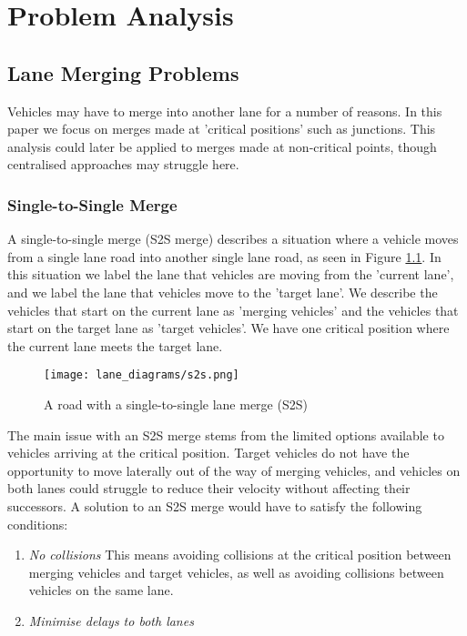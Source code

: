 \chapter{Problem Analysis}
\label{cha:Problem Analysis}

\section{Lane Merging Problems}
\label{sec:Lane Merging Problems}
Vehicles may have to merge into another lane for a number of reasons. In this paper we focus on merges made at 'critical positions' such as junctions. This analysis could later be applied to merges made at non-critical points, though centralised approaches may struggle here.

\subsection{Single-to-Single Merge}
\label{subsec:Single-to-Single Merge}
A single-to-single merge (S2S merge) describes a situation where a vehicle moves from a single lane road into another single lane road, as seen in Figure \ref{fig:S2SMerge}. In this situation we label the lane that vehicles are moving from the 'current lane', and we label the lane that vehicles move to the 'target lane'. We describe the vehicles that start on the current lane as 'merging vehicles' and the vehicles that start on the target lane as 'target vehicles'. We have one critical position where the current lane meets the target lane.

\begin{figure}[htb]
\texttt{[image: lane\_diagrams/s2s.png]}
\caption{A road with a single-to-single lane merge (S2S)}
\label{fig:S2SMerge}
\end{figure}


The main issue with an S2S merge stems from the limited options available to vehicles arriving at the critical position. Target vehicles do not have the opportunity to move laterally out of the way of merging vehicles, and vehicles on both lanes could struggle to reduce their velocity without affecting their successors. A solution to an S2S merge would have to satisfy the following conditions:

\begin{enumerate}
\item \textit{No collisions}
This means avoiding collisions at the critical position between merging vehicles and target vehicles, as well as avoiding collisions between vehicles on the same lane.
\item \textit{Minimise delays to both lanes}


\end{enumerate}

